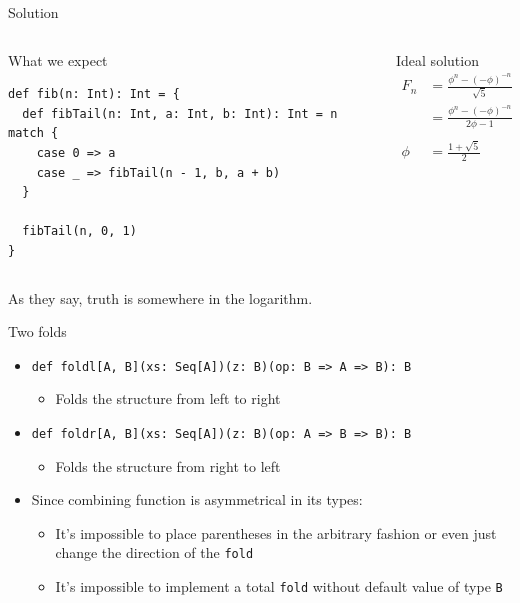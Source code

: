 \documentclass[presentation,aspectratio=169,smaller]{beamer}
\begin{document}
\begin{frame}[label={sec:orga7ae3fc},fragile]{Solution}
 \begin{columns}
\begin{column}[t]{0.5\columnwidth}
\begin{block}{What we expect}
\begin{verbatim}
def fib(n: Int): Int = {
  def fibTail(n: Int, a: Int, b: Int): Int = n match {
    case 0 => a
    case _ => fibTail(n - 1, b, a + b)
  }

  fibTail(n, 0, 1)
}
\end{verbatim}
\end{block}
\end{column}



\begin{column}[t]{0.5\columnwidth}
\begin{block}{Ideal solution}
\begin{align*}
  F_n &= \frac {\phi ^ n - {(- \phi)}^{-n}} {\sqrt{5}} \\
  &= \frac {\phi ^ n - {(- \phi)}^{-n}} {2\phi - 1} \\
  \\
  \phi &= \frac {1 + \sqrt{5}}{2}
\end{align*}

\pause
\end{block}
\end{column}
\end{columns}

As they say, truth is somewhere in the logarithm.
\end{frame}
\begin{frame}[label={sec:org3835dfa},fragile]{Two folds}
 \begin{itemize}
\item \texttt{def foldl[A, B](xs: Seq[A])(z: B)(op: B => A => B): B}
\begin{itemize}
\item Folds the structure from left to right
\end{itemize}
\item \texttt{def foldr[A, B](xs: Seq[A])(z: B)(op: A => B => B): B}
\begin{itemize}
\item Folds the structure from right to left
\end{itemize}
\item Since combining function is asymmetrical in its types:
\begin{itemize}
\item It’s impossible to place parentheses in the arbitrary fashion or even just
change the direction of the \texttt{fold}
\item It’s impossible to implement a total \texttt{fold} without default value of type \texttt{B}
\end{itemize}
\end{itemize}
\end{frame}
\end{document}
